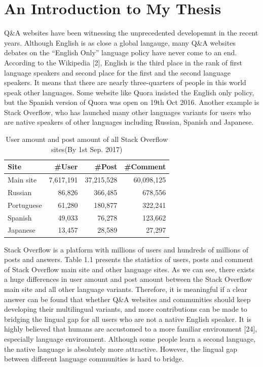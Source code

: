 
\chapter{An Introduction to My Thesis}
\label{cha:intro}
	Q\&A websites have been witnessing the 	unprecedented developemnt in the recent years. Although English is as close a global langauge, many Q\&A websites debates on the “English Only” language policy have never come to an end. According to the Wikipedia [2], English is the third place in the rank of first language speakers and second place for the first and the second language speakers. It means that there are nearly three-quarters of people in this world speak other languages. Some website like Quora insisted the English only policy, but the Spanish version of Quora was open on 19th Oct 2016. Another example is Stack Overflow, who has launched many other languages variants for users who are native speakers of other languages including Russian, Spanish and Japanese. \par
	\begin{table}[h!]
		\centering
		\caption{User amount and post amount of all Stack Overflow sites(By 1st Sep. 2017)}
		\label{tab:table1}
		\begin{tabular}{lrrr}
			Site & \#User & \#Post & \#Comment\\
			\hline
			Main site & 7,617,191  &  37,215,528 & 60,098,125\\
			Russian & 86,826 &  366,485 & 678,556\\
			Portuguese & 61,280 & 180,877& 322,241\\
			Spanish & 49,033 & 76,278 & 123,662\\
			Japanese & 13,457 & 28,589& 27,297\\
		\end{tabular}
	\end{table}
	
	Stack Overflow is a platform with millions of users and hundreds of millions of posts and answers. Table 1.1 presents the statistics of users, posts and comment of Stack Overflow main site and other language sites. As we can see, there exists a huge differences in user amount and post amount between the Stack Overflow main site and all other language variants. Therefore, it is meaningful if a clear answer can be found that whether Q\&A websites and communities should keep developing their multilingual variants, and more contributions can be made to bridging the lingual gap for all users who are not a native English speaker. It is highly believed that humans are accustomed to a more familiar environment [24], especially language environment. Although some people learn a second language, the native language is absolutely more attractive. However, the lingual gap between different language communities is hard to bridge. 

